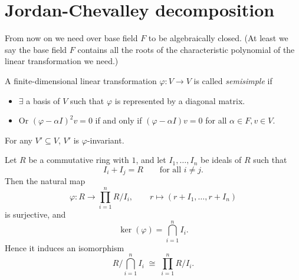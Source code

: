 \section{Jordan-Chevalley decomposition}

From now on we need over base field $F$ to be algebraically closed. (At least we say the base field $F$ contains all the roots of the characteristic polynomial of the linear transformation we need.)

\begin{definition}
    A finite-dimensional linear transformation $\varphi: V \to V$ is called \emph{semisimple} if
    \begin{itemize}
        \item $\exists$ a basis of $V$ such that $\varphi$ is represented by a diagonal matrix.
        \item Or $(\varphi-\alpha I)^2 v=0$ if and only if $(\varphi-\alpha I)v=0$ for all $\alpha \in F, v \in V$.
    \end{itemize}
    For any $V' \subseteq V$, $V'$ is $\varphi$-invariant.
\end{definition}

\begin{lemma}
    Let $R$ be a commutative ring with $1$, and let $I_1,\dots,I_n$ be ideals of $R$ such that
    \[
        I_i+I_j=R \qquad \text{for all } i\ne j.
    \]
    Then the natural map
    \[
        \varphi:R\to \prod_{i=1}^n R/I_i,\qquad
        r\mapsto (r+I_1,\dots,r+I_n)
    \]
    is surjective, and
    \[
        \ker(\varphi)=\bigcap_{i=1}^n I_i.
    \]
    Hence it induces an isomorphism
    \[
        R\Big/\bigcap_{i=1}^n I_i \;\cong\; \prod_{i=1}^n R/I_i.
    \]
\end{lemma}

